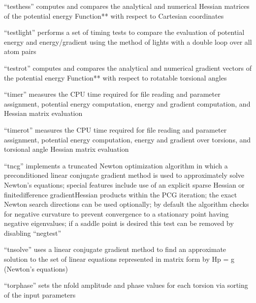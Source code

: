 \documentclass[letterpaper,11pt,english]{sphinxmanual}
\begin{document}

“testhess” computes and compares the analytical and numerical Hessian matrices of the potential energy Function** with respect to Cartesian coordinates


“testlight” performs a set of timing tests to compare the evaluation of potential energy and energy/gradient using the method of lights with a double loop over all atom pairs


“testrot” computes and compares the analytical and numerical gradient vectors of the potential energy Function** with respect to rotatable torsional angles


“timer” measures the CPU time required for file reading and parameter assignment, potential energy computation, energy and gradient computation, and Hessian matrix evaluation


“timerot” measures the CPU time required for file reading and parameter assignment, potential energy computation, energy and gradient over torsions, and torsional angle Hessian matrix evaluation


“tncg” implements a truncated Newton optimization algorithm in which a preconditioned linear conjugate gradient method is used to approximately solve Newton’s equations; special features include use of an explicit sparse Hessian or finite\sphinxhyphen{}difference gradient\sphinxhyphen{}Hessian products within the PCG iteration; the exact Newton search directions can be used optionally; by default the algorithm checks for negative curvature to prevent convergence to a stationary point having negative eigenvalues; if a saddle point is desired this test can be removed by disabling “negtest”


“tnsolve” uses a linear conjugate gradient method to find an approximate solution to the set of linear equations represented in matrix form by Hp = \sphinxhyphen{}g (Newton’s equations)


“torphase” sets the n\sphinxhyphen{}fold amplitude and phase values for each torsion via sorting of the input parameters
\end{document}
